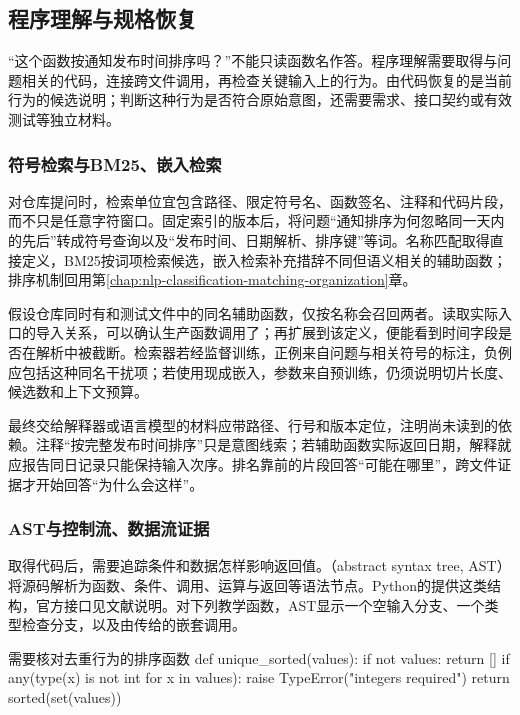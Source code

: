 \subsection{程序理解与规格恢复}
\label{sec:nlp-execution-understanding}

“这个函数按通知发布时间排序吗？”不能只读函数名作答。程序理解需要取得与问题相关的代码，连接跨文件调用，再检查关键输入上的行为。由代码恢复的是当前行为的候选说明；判断这种行为是否符合原始意图，还需要需求、接口契约或有效测试等独立材料。

\subsubsection{符号检索与BM25、嵌入检索}
\label{sec:nlp-execution-code-retrieval}

对仓库提问时，检索单位宜包含路径、限定符号名、函数签名、注释和代码片段，而不只是任意字符窗口。固定索引的版本后，将问题“通知排序为何忽略同一天内的先后”转成符号查询以及“发布时间、日期解析、排序键”等词。名称匹配取得直接定义，BM25按词项检索候选，嵌入检索补充措辞不同但语义相关的辅助函数；排序机制回用第\ref{chap:nlp-classification-matching-organization}章。

假设仓库同时有和测试文件中的同名辅助函数，仅按名称会召回两者。读取实际入口的导入关系，可以确认生产函数调用了；再扩展到该定义，便能看到时间字段是否在解析中被截断。检索器若经监督训练，正例来自问题与相关符号的标注，负例应包括这种同名干扰项；若使用现成嵌入，参数来自预训练，仍须说明切片长度、候选数和上下文预算。

最终交给解释器或语言模型的材料应带路径、行号和版本定位，注明尚未读到的依赖。注释“按完整发布时间排序”只是意图线索；若辅助函数实际返回日期，解释就应报告同日记录只能保持输入次序。排名靠前的片段回答“可能在哪里”，跨文件证据才开始回答“为什么会这样”。

\subsubsection{AST与控制流、数据流证据}
\label{sec:nlp-execution-ast}

取得代码后，需要追踪条件和数据怎样影响返回值。（abstract syntax tree, AST）将源码解析为函数、条件、调用、运算与返回等语法节点。Python的提供这类结构，官方接口见文献说明。对下列教学函数，AST显示一个空输入分支、一个类型检查分支，以及由传给的嵌套调用。

\begin{codeblock}[language=Python,label={code:nlp-execution-sort-trace}]{需要核对去重行为的排序函数}
def unique_sorted(values):
    if not values:
        return []
    if any(type(x) is not int for x in values):
        raise TypeError("integers required")
    return sorted(set(values))
\end{codeblock}

